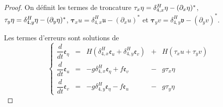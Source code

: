 \begin{proof}
On définit les termes de troncature $\mathbf{\tau}_x \eta = \delta_{4,x}^H \mathbf{\eta}- (\partial_x \eta)^*$, $\mathbf{\tau}_y \eta = \delta_{4,y}^H \mathbf{\eta}- (\partial_y \eta)^*$, $\mathbf{\tau}_x u = \delta_{4,x}^H \mathfrak{u}- (\partial_x u)^*$ et $\mathbf{\tau}_y v = \delta_{4,y}^H \mathfrak{v}- (\partial_y v)^*$.

Les termes d'erreurs sont solutions de 
\begin{equation}
\left\lbrace
\begin{array}{rcccl}
\dfrac{d}{dt} \mathfrak{e}_{\eta} & = &  H \left( \delta_{4,x}^H \mathfrak{e}_u + \delta_{4,y}^H \mathfrak{e}_v \right) & + & H \left( \tau_x u + \tau_y v \right)\\
\dfrac{d}{dt} \mathfrak{e}_u & = & -g \delta_{4,x}^H \mathfrak{e}_{\eta} + f \mathfrak{e}_v & - & g \tau_x \eta \\
\dfrac{d}{dt}\mathfrak{e}_v & = & - g \delta_{4,y}^H \mathfrak{e}_{\eta} - f \mathfrak{e}_u
 & - & g \tau_y \eta  \end{array}
\right.
\end{equation}


\end{proof}
